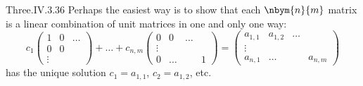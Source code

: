 \begin{ans}{Three.IV.3.36}
      Perhaps the easiest way is to show that each \( \nbym{n}{m} \) matrix
      is a linear combination of unit matrices in one and only one way:
      \begin{equation*}
        c_1\begin{pmatrix}
             1  &0  &\ldots  \\
             0  &0           \\
             \vdots
           \end{pmatrix}
        +\dots+
        c_{n,m}\begin{pmatrix}
             0  &0      &\ldots  \\
             \vdots              \\
             0  &\ldots &       &1
           \end{pmatrix}
        =\begin{pmatrix}
           a_{1,1} &a_{1,2} &\ldots          \\
           \vdots                            \\
           a_{n,1} &\ldots  &      &a_{n,m}
         \end{pmatrix}
      \end{equation*}
      has the unique solution \( c_1=a_{1,1} \), \( c_2=a_{1,2} \),
      etc.
    
\end{ans}
